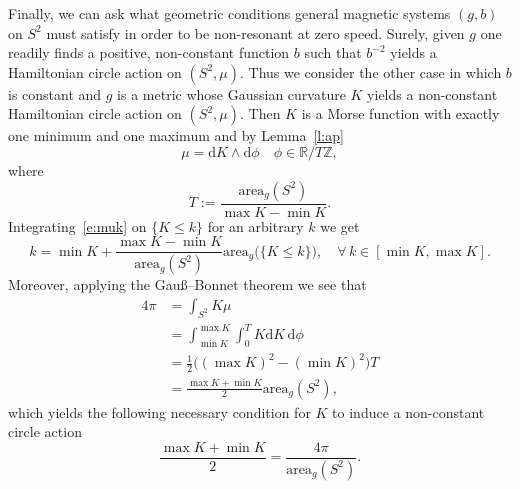 \documentclass[10pt]{amsart}
\theoremstyle{definition}
\newcommand{\Z}{\mathbb{Z}}
\newcommand{\R}{\mathbb{R}}
\newcommand{\diff}{\mathrm{d}}
\newcommand{\area}{\mathrm{area}}
\let\oldforall\forall
\renewcommand*{\forall}{\mathrel{\oldforall}}
\begin{document}
Finally, we can ask what geometric conditions general magnetic systems $(g,b)$ on $S^2$ must satisfy in order to be non-resonant at zero speed. Surely, given $g$ one readily finds a positive, non-constant function $b$ such that $b^{-2}$ yields a Hamiltonian circle action on $(S^2,\mu)$. Thus we consider the other case in which $b$ is constant and $g$ is a metric whose Gaussian curvature $K$ yields a non-constant Hamiltonian circle action on $(S^2,\mu)$. Then $K$ is a Morse function with exactly one minimum and one maximum and by Lemma~\ref{l:ap}
\begin{equation}\label{e:muk}
\mu=\diff K\wedge \diff\phi\quad \phi\in\R/T\Z,
\end{equation}
where
\[
T:=\frac{\area_g(S^2)}{\max K-\min K}.
\]
Integrating~\eqref{e:muk} on $\{K\leq k\}$ for an arbitrary $k$ we get
\begin{equation}\label{e:Kres0}
k=\min K+\frac{\max K-\min K}{\area_g(S^2)}\area_g\big(\{K\leq k\}\big),\quad \forall\,k\in[\min K,\max K].
\end{equation}
Moreover, applying the Gau\ss--Bonnet theorem we see that
\begin{align*}
4\pi&=\int_{S^2}K\mu\\
&=\int_{\min K}^{\max K}\int_0^TK\diff K\,\diff\phi\\
&=\frac12\big((\max K)^2-(\min K)^2\big)T\\
&=\frac{\max K+\min K}{2}\area_g(S^2),
\end{align*}
which yields the following necessary condition for $K$ to induce a non-constant circle action
\begin{equation}\label{e:Kres}
\frac{\max K+\min K}{2}=\frac{4\pi}{\area_g(S^2)}.
\end{equation}
\end{document}

